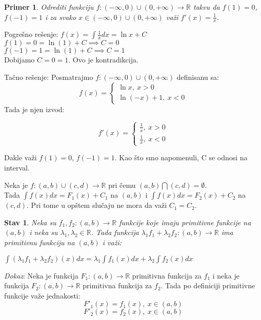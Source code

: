 \documentclass{article}
\newtheorem{stav}{Stav}[section]
\newtheorem{prim}{Primer}[section]
\begin{document}
\begin{primbox}
    \begin{prim}
        Odrediti funkciju $f: (-\infty, 0)\cup(0, +\infty)
            \longrightarrow \mathbb{R}$ takvu da $f(1) = 0$,
        $f(-1) = 1$ i za svako $x \in (-\infty, 0)
            \cup(0, +\infty)$ važi
        $f'(x) = \frac{1}{x}$.\par
    \end{prim}
    Pogrešno rešenje: $f(x) = \int \frac{1}{x}dx = \ln x + C$\\
    $f(1) = 0 = \ln(1) + C \implies C = 0$\\
    $f(-1) = 1 = \ln(1) + C \implies C = 1$\\
    Dobijamo $C=0=1$. Ovo je kontradikcija.\par
    Tačno rešenje: Posmatrajmo $f: (-\infty, 0)\cup(0, +\infty)$
    definisanu sa:
    $$
        f(x) =
        \begin{cases}
            \ln x,\ x > 0 \\
            \ln (-x) + 1,\ x < 0
        \end{cases}
    $$
    Tada je njen izvod:

    $$f'(x) =
        \begin{cases}
            \frac{1}{x},\ x > 0 \\
            \frac{1}{x},\ x < 0
        \end{cases}$$

    Dakle važi $f(1) = 0$, $f(-1) = 1$. Kao što smo napomenuli,
    C se odnosi na interval.
\end{primbox}
Neka je $f:(a, b)\cup(c, d) \longrightarrow
    \mathbb{R}$ pri čemu $(a, b) \bigcap (c, d) = \emptyset$.\\
Tada $\int f(x) dx = F_1(x) + C_1$ na
$(a, b)$ i $\int f(x) dx = F_2(x) + C_2$ na $(c, d)$.
Pri tome u opštem slučaju ne mora da važi $C_1 = C_2$.
\begin{stavbox}
    \begin{stav}
        Neka su $f_1, f_2 : (a, b) \longrightarrow \mathbb{R}$
        funkcije koje imaju primitivne funkcije na $(a, b)$ i neka
        su $\lambda_1 , \lambda_2 \in \mathbb{R}$. Tada funkcija
        $\lambda_1 f_1 + \lambda_2 f_2 : (a, b) \longrightarrow
            \mathbb{R}$ ima primitivnu funkciju na $(a, b)$ i važi:\par
        $\int (\lambda_1 f_1 + \lambda_2 f_2)(x)dx = \lambda_1\int
            f_1(x) dx + \lambda_2\int f_2(x) dx$
    \end{stav}
\end{stavbox}
\setcounter{equation}{0}
\textit{Dokaz}: Neka je funkcija $F_1: (a, b) \longrightarrow \mathbb{R}$
primitivna funkcija za $f_1$ i neka je funkcija $F_2: (a, b)
    \longrightarrow \mathbb{R}$ primitivna funkcija za $f_2$.
Tada po definiciji primitivne funkcije važe jednakosti:
\begin{equation} \label{stav_1.2.1}
    F'_1(x) = f_1(x),\ x \in (a, b)
\end{equation}
\begin{equation} \label{stav_1.2.2}
    F'_2(x) = f_2(x),\ x \in (a, b)
\end{equation}
\end{document}
